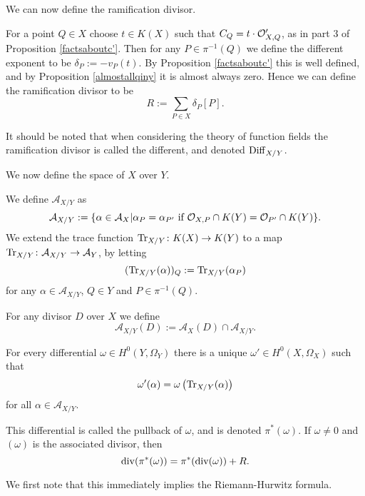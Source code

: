 We can now define the ramification divisor.


    \begin{defn}
    For a point $Q\in X$ choose $t\in K(X)$ such that $C_Q = t\cdot {\cal O}_{X,Q}'$, as in part 3 of Proposition \ref{factsaboutc'}.
    Then for any $P\in \pi^{-1}(Q)$ we define the different exponent to be $\delta_P := -v_P(t)$.
    By Proposition \ref{factsaboutc'} this is well defined, and by Proposition \ref{almostallqiny} it is almost always zero.
    Hence we can define the ramification divisor to be
        \[
        R := \sum_{P\in X} \delta_P [P].
        \]
    \end{defn}

    \begin{rem}
    It should be noted that when considering the theory of function fields the ramification divisor is called the different, and denoted ${\rm Diff}_{X/Y}$.
    \end{rem}

We now define the \adele space of $X$ over $Y$.

    \begin{defn}
    We define $\mathcal {A}_{X/Y}$ as
        \[
        \mathcal{A}_{X/Y} := \{\alpha \in \mathcal{A}_X | \alpha_P =\alpha_{P'}\ \text{if}\ {\cal O}_{X,P}\cap K(Y) = {\cal O}_{P'}\cap K(Y)\}.
        \]
    We extend the trace function $\operatorname{Tr}_{X/Y}\colon K(X)\rightarrow K(Y)$ to a map $\operatorname{Tr}_{X/Y}\colon \mathcal{A}_{X/Y} \rightarrow \mathcal{A}_Y$,  by letting
        \[
        (\operatorname{Tr}_{X/Y}(\alpha))_Q := \operatorname{Tr}_{X/Y}(\alpha_P)
        \]
    for any $\alpha \in \mathcal{A}_{X/Y}$, $Q\in Y$ and $P\in \pi^{-1}(Q)$.
    
    For any divisor $D$ over $X$ we define
        \[
        \mathcal{A}_{X/Y}(D) := \mathcal{A}_X(D) \cap \mathcal{A}_{X/Y}.
        \]
    
    \end{defn}


    \begin{defnthm}\label{detailedhurwitz}
    For every differential $\omega\in H^0(Y,\Omega_Y)$ there is a unique $\omega'\in H^0(X,\Omega_X)$ such that
        \[
        \omega'(\alpha) = \omega\left(\operatorname{Tr}_{X/Y}(\alpha)\right)
        \]
    for all $\alpha \in {\mathcal A}_{X/Y}$.
    
    This differential is called the {\rm pullback} of $\omega$, and is denoted $\pi^*(\omega)$. 
    If $\omega\neq 0$ and $(\omega)$ is the associated divisor, then 
        \[
        \operatorname{div} ( \pi^*(\omega)) = \pi^*(\operatorname{div}(\omega)) + R.
        \]
    \end{defnthm}
We first note that this immediately implies the Riemann-Hurwitz formula.




